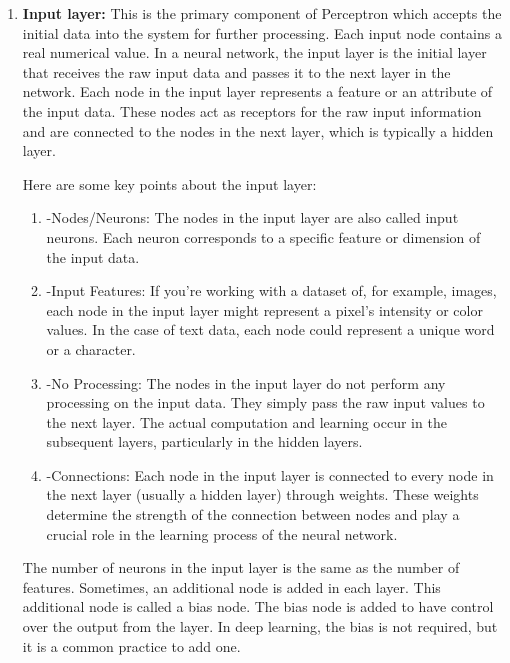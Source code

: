 \begin{enumerate}
    \item \textbf{Input layer: } This is the primary component of Perceptron which accepts the initial data into the system for further processing. Each input node contains a real numerical value.
    In a neural network, the input layer is the initial layer that receives the raw input data and passes it to the next layer in the network. Each node in the input layer represents a feature or an attribute of the input data. These nodes act as receptors for the raw input information and are connected to the nodes in the next layer, which is typically a hidden layer.
    
    Here are some key points about the input layer:
    \begin{enumerate}
        \item -Nodes/Neurons: The nodes in the input layer are also called input neurons. Each neuron corresponds to a specific feature or dimension of the input data.
        \item -Input Features: If you're working with a dataset of, for example, images, each node in the input layer might represent a pixel's intensity or color values. In the case of text data, each node could represent a unique word or a character.
        \item -No Processing: The nodes in the input layer do not perform any processing on the input data. They simply pass the raw input values to the next layer. The actual computation and learning occur in the subsequent layers, particularly in the hidden layers.
        \item -Connections: Each node in the input layer is connected to every node in the next layer (usually a hidden layer) through weights. These weights determine the strength of the connection between nodes and play a crucial role in the learning process of the neural network.
    \end{enumerate}
    The number of neurons in the input layer is the same as the number of features. Sometimes, an additional node is added in each layer. This additional node is called a bias node. The bias node is added to have control over the output from the layer. In deep learning, the bias is not required, but it is a common practice to add one.\\
    

\end{enumerate}
